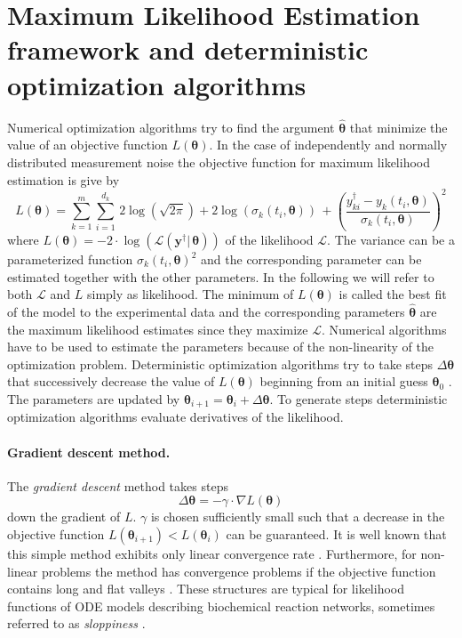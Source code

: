 \documentclass[12pt,a4paper]{scrartcl}
\begin{document}
\section{Maximum Likelihood Estimation framework and deterministic optimization algorithms} \label{sec:det_optimization}
Numerical optimization algorithms try to find the argument $\boldsymbol{\hat \theta}$ that minimize the value of an objective function $L(\boldsymbol{\theta})$. In the case of independently and normally distributed measurement noise the objective function for maximum likelihood estimation is give by
\begin{equation}
	L(\boldsymbol{\theta}) = \sum_{k=1}^m \sum_{i=1}^{d_k}\, 2\log(\sqrt{2 \pi}) + 2\log(\sigma_k(t_i, \boldsymbol{\theta}))\, + \left(\frac{y_{ki}^\dagger - y_{k}(t_{i}, \boldsymbol{\theta})}{\sigma_k(t_i, \boldsymbol{\theta})}\right)^2 \label{llhoodfun2}
\end{equation}
where $L(\boldsymbol{\theta}) =  - 2\cdot \log(\mathcal{L}(\mathbf{y}^\dagger|\,\boldsymbol{\theta}))$ of the likelihood $\mathcal{L}$. The variance can be a parameterized function $\sigma_k(t_i, \boldsymbol{\theta})^2$ and the corresponding parameter can be estimated together with the other parameters. In the following we will refer to both $\mathcal{L}$ and $L$ simply as likelihood. The minimum of $L(\boldsymbol{\theta})$ is called the best fit of the model to the experimental data and the corresponding parameters $\boldsymbol{\hat \theta}$ are the maximum likelihood estimates since they maximize $\mathcal{L}$. Numerical algorithms have to be used to estimate the parameters because of the non-linearity of the optimization problem. Deterministic optimization algorithms try to take steps $\Delta \boldsymbol{\theta}$ that successively decrease the value of $L(\boldsymbol{\theta})$ beginning from an initial guess $\boldsymbol{\theta}_0$ \citep{Press:1990rw}. The parameters are updated by $\boldsymbol{\theta}_{i+1} = \boldsymbol{\theta}_{i} + \Delta \boldsymbol{\theta}$. To generate steps deterministic optimization algorithms evaluate derivatives of the likelihood. 

\paragraph{Gradient descent method.}
The \emph{gradient descent} method takes steps 
\begin{equation}
	\Delta \boldsymbol{\theta} = - \gamma \cdot \nabla L(\boldsymbol{\theta}) \label{gradientstep}
\end{equation}	
down the gradient of $L$. $\gamma$ is chosen sufficiently small such that a decrease in the objective function $L(\boldsymbol{\theta}_{i+1}) < L(\boldsymbol{\theta}_{i})$ can be guaranteed. It is well known that this simple method exhibits only linear convergence rate \citep{Stoer:2005fk}. Furthermore, for non-linear problems the method has convergence problems if the objective function contains long and flat valleys \citep{Rosenbrock:1960fk}. These structures are typical for likelihood functions of ODE models describing biochemical reaction networks, sometimes referred to as \emph{sloppiness} \citep{Gutenkunst:2007ct}. 
\end{document}
